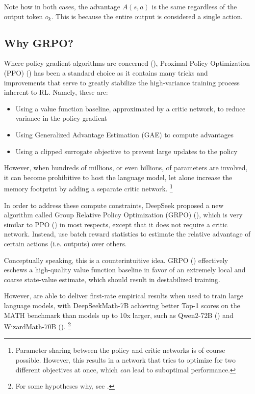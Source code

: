 \documentclass{article} %
\theoremstyle{definition}
\begin{document}
Note how in both cases, the advantage $A(s, a)$ is the same regardless of the output token $o_k$. This is 
because the entire output is considered a single action.

\subsection{Why GRPO?}

Where policy gradient algorithms are concerned (\cite{Weng-2018}), Proximal Policy Optimization (PPO) (\cite{ppo}) 
has been a standard choice as it contains many tricks and improvements
that serve to greatly stabilize the high-variance training process inherent to RL.
Namely, these are:
\begin{itemize}
    \item Using a value function baseline, approximated by a critic network, to reduce variance in the policy gradient
    \item Using Generalized Advantage Estimation (GAE) to compute advantages
    \item Using a clipped surrogate objective to prevent large updates to the policy
\end{itemize}

However, when hundreds of millions, or even billions, of parameters are involved,
it can become prohibitive to host the language model, let alone increase the memory footprint
by adding a separate critic network. \footnote{
    Parameter sharing between the policy and critic networks is of course possible.
    However, this results in a network that tries to optimize for two different objectives at once,
    which \textit{can} lead to suboptimal performance.
}

In order to address these compute constraints, DeepSeek proposed a new algorithm called Group Relative Policy Optimization (GRPO) (\cite{grpo}),
which is very similar to PPO (\cite{ppo}) in most respects, except that it does not require a critic network.
Instead, \cite{grpo} use batch reward statistics to estimate the relative advantage of certain actions (i.e. outputs) over others.

Conceptually speaking, this is a counterintuitive idea. GRPO (\cite{grpo}) effectively eschews a high-quality value function baseline 
in favor of an extremely local and coarse state-value estimate, which should result in destabilized training.

However, \cite{grpo} are able to deliver first-rate empirical results when used to 
train large language models, with DeepSeekMath-7B achieving better Top-1 scores on 
the MATH benchmark than models up to 10x larger, such as Qwen2-72B (\cite{Qwen2}) and WizardMath-70B (\cite{wizardmath}). \footnote{
    For some hypotheses why, see \cite{beh-2025}.
}
\end{document}

